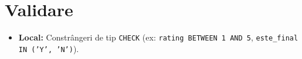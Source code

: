 \section{Validare}
\begin{itemize}
    \item \textbf{Local:} Constrângeri de tip \texttt{CHECK} (ex: \texttt{rating BETWEEN 1 AND 5}, \texttt{este\_final IN ('Y', 'N')}).
\end{itemize}